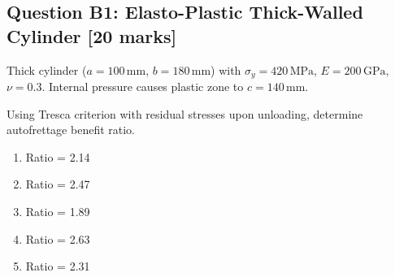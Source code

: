 \documentclass[12pt,a4paper]{article}
\begin{document}
\begin{questionbox}
\subsection*{Question B1: Elasto-Plastic Thick-Walled Cylinder [20 marks]}
Thick cylinder ($a = 100\,\text{mm}$, $b = 180\,\text{mm}$) with $\sigma_y = 420\,\text{MPa}$, 
$E = 200\,\text{GPa}$, $\nu = 0.3$. Internal pressure causes plastic zone to $c = 140\,\text{mm}$.

\begin{center}
\end{center}

Using Tresca criterion with residual stresses upon unloading, determine autofrettage benefit ratio.

\begin{mcqbox}
\begin{enumerate}[label=(\Alph*),leftmargin=*]
    \item Ratio = 2.14
    \item Ratio = 2.47
    \item Ratio = 1.89
    \item Ratio = 2.63
    \item Ratio = 2.31
\end{enumerate}
\end{mcqbox}
\end{questionbox}
\end{document}
